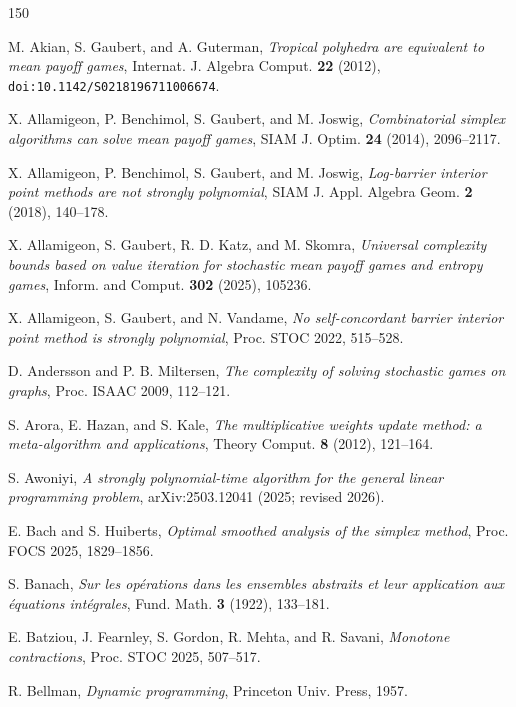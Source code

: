 \begin{thebibliography}{150}
\small
{}

M. Akian, S. Gaubert, and A. Guterman, \emph{Tropical polyhedra are equivalent to mean payoff games}, Internat. J. Algebra Comput. \textbf{22} (2012), \texttt{doi:10.1142/S0218196711006674}.

X. Allamigeon, P. Benchimol, S. Gaubert, and M. Joswig, \emph{Combinatorial simplex algorithms can solve mean payoff games}, SIAM J. Optim. \textbf{24} (2014), 2096--2117.

X. Allamigeon, P. Benchimol, S. Gaubert, and M. Joswig, \emph{Log-barrier interior point methods are not strongly polynomial}, SIAM J. Appl. Algebra Geom. \textbf{2} (2018), 140--178.

X. Allamigeon, S. Gaubert, R. D. Katz, and M. Skomra, \emph{Universal complexity bounds based on value iteration for stochastic mean payoff games and entropy games}, Inform. and Comput. \textbf{302} (2025), 105236.

X. Allamigeon, S. Gaubert, and N. Vandame, \emph{No self-concordant barrier interior point method is strongly polynomial}, Proc. STOC 2022, 515--528.

D. Andersson and P. B. Miltersen, \emph{The complexity of solving stochastic games on graphs}, Proc. ISAAC 2009, 112--121.

S. Arora, E. Hazan, and S. Kale, \emph{The multiplicative weights update method: a meta-algorithm and applications}, Theory Comput. \textbf{8} (2012), 121--164.

S. Awoniyi, \emph{A strongly polynomial-time algorithm for the general linear programming problem}, arXiv:2503.12041 (2025; revised 2026).

E. Bach and S. Huiberts, \emph{Optimal smoothed analysis of the simplex method}, Proc. FOCS 2025, 1829--1856.

S. Banach, \emph{Sur les op\'erations dans les ensembles abstraits et leur application aux \'equations int\'egrales}, Fund. Math. \textbf{3} (1922), 133--181.

E. Batziou, J. Fearnley, S. Gordon, R. Mehta, and R. Savani, \emph{Monotone contractions}, Proc. STOC 2025, 507--517.

R. Bellman, \emph{Dynamic programming}, Princeton Univ. Press, 1957.


\end{thebibliography}
